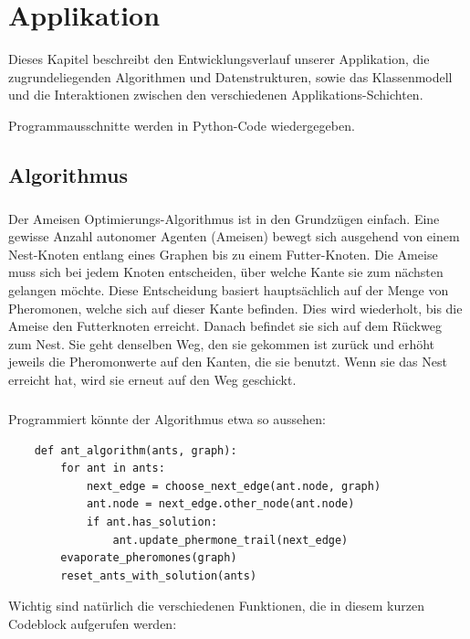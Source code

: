 
\chapter{Applikation}

Dieses Kapitel beschreibt den Entwicklungsverlauf unserer Applikation, die zugrundeliegenden Algorithmen und Datenstrukturen, sowie das Klassenmodell und die Interaktionen zwischen den verschiedenen Applikations-Schichten.

Programmausschnitte werden  in Python-Code wiedergegeben.

\section{Algorithmus}

\paragraph*{}
Der Ameisen Optimierungs-Algorithmus ist in den Grundzügen einfach. Eine gewisse Anzahl autonomer Agenten (Ameisen) bewegt sich ausgehend von einem Nest-Knoten entlang eines Graphen bis zu einem Futter-Knoten. Die Ameise muss sich bei jedem Knoten entscheiden, über welche Kante sie zum nächsten gelangen möchte. Diese Entscheidung basiert hauptsächlich auf der Menge von Pheromonen, welche sich auf dieser Kante befinden. Dies wird wiederholt, bis die Ameise den Futterknoten erreicht. Danach befindet sie sich auf dem Rückweg zum Nest. Sie geht denselben Weg, den sie gekommen ist zurück und erhöht jeweils die Pheromonwerte auf den Kanten, die sie benutzt. Wenn sie das Nest erreicht hat, wird sie erneut auf den Weg geschickt.

\paragraph*{}
Programmiert könnte der Algorithmus etwa so aussehen:

\begin{lstlisting}
	def ant_algorithm(ants, graph):
		for ant in ants:
			next_edge = choose_next_edge(ant.node, graph)
			ant.node = next_edge.other_node(ant.node)
			if ant.has_solution:
				ant.update_phermone_trail(next_edge)	
		evaporate_pheromones(graph)
		reset_ants_with_solution(ants)
\end{lstlisting}

Wichtig sind natürlich die verschiedenen Funktionen, die in diesem kurzen Codeblock aufgerufen werden:

